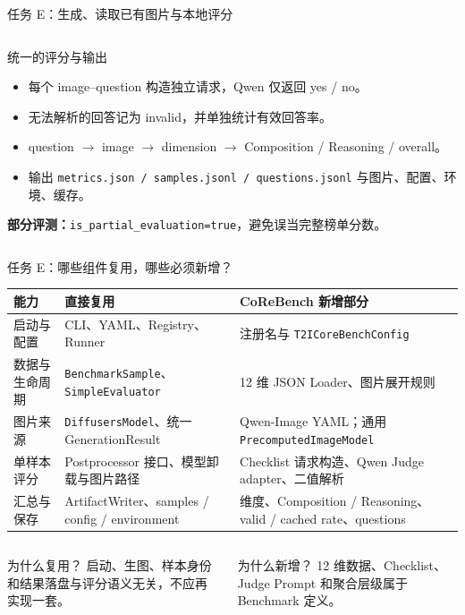 \documentclass[aspectratio=169,10pt]{beamer}
\begin{document}
\begin{frame}{任务 E：生成、读取已有图片与本地评分}
\begin{columns}[T,onlytextwidth]
\begin{block}{统一的评分与输出}
\begin{minipage}[c][4.95cm][c]{\linewidth}
          \begin{itemize}\scriptsize
            \item 每个 image--question 构造独立请求，Qwen 仅返回 yes / no。
            \item 无法解析的回答记为 invalid，并单独统计有效回答率。
            \item question $\rightarrow$ image $\rightarrow$ dimension $\rightarrow$ Composition / Reasoning / overall。
            \item 输出 \texttt{metrics.json / samples.jsonl / questions.jsonl} 与图片、配置、环境、缓存。
          \end{itemize}
          \vspace{0.35em}
          \scriptsize\textbf{部分评测：}\texttt{is\_partial\_evaluation=true}，避免误当完整榜单分数。
        \end{minipage}
      \end{block}
  \end{columns}
\end{frame}

\begin{frame}{任务 E：哪些组件复用，哪些必须新增？}
  \begin{table}
    \centering\scriptsize
    \renewcommand{\arraystretch}{1.32}
    \begin{tabularx}{\textwidth}{p{2.35cm}X X}
      \toprule
      能力 & 直接复用 & CoReBench 新增部分 \\
      \midrule
      启动与配置 & CLI、YAML、Registry、Runner & 注册名与 \texttt{T2ICoreBenchConfig} \\
      数据与生命周期 & \texttt{BenchmarkSample}、\texttt{SimpleEvaluator} & 12 维 JSON Loader、图片展开规则 \\
      图片来源 & \texttt{DiffusersModel}、统一 GenerationResult & Qwen-Image YAML；通用 \texttt{PrecomputedImageModel} \\
      单样本评分 & Postprocessor 接口、模型卸载与图片路径 & Checklist 请求构造、Qwen Judge adapter、二值解析 \\
      汇总与保存 & ArtifactWriter、samples / config / environment & 维度、Composition / Reasoning、valid / cached rate、questions \\
      \bottomrule
    \end{tabularx}
  \end{table}

  \vspace{0.7em}
  \begin{columns}[T,onlytextwidth]
      \begin{block}{为什么复用？}
        \centering\small
        启动、生图、样本身份和结果落盘与评分语义无关，不应再实现一套。
      \end{block}
      \begin{block}{为什么新增？}
        \centering\small
        12 维数据、Checklist、Judge Prompt 和聚合层级属于 Benchmark 定义。
      \end{block}
  \end{columns}
\end{frame}
\end{document}
